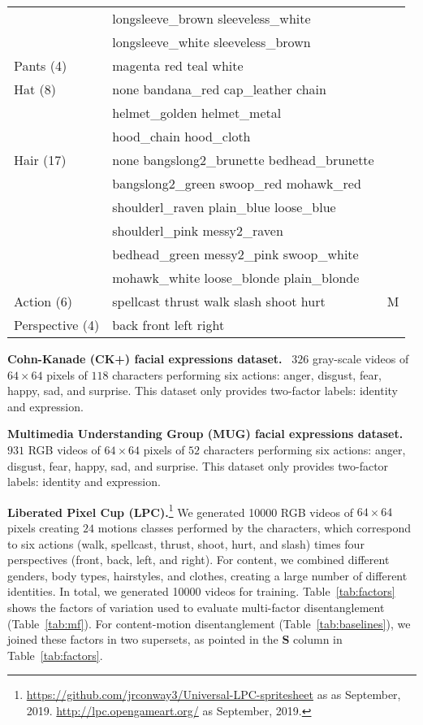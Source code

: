 \begin{table}[tb]
{\begin{tabular}{>{\ttfamily}l>{\ttfamily}l>{\ttfamily}r}
            & longsleeve\_brown sleeveless\_white \\
            & longsleeve\_white sleeveless\_brown \\ %
Pants (4) & magenta red teal white \\ %
Hat (8)   & none bandana\_red cap\_leather chain \\
          & helmet\_golden helmet\_metal \\
          & hood\_chain hood\_cloth \\ %
Hair (17) & none bangslong2\_brunette bedhead\_brunette \\
          & bangslong2\_green swoop\_red mohawk\_red \\
          & shoulderl\_raven plain\_blue loose\_blue \\
          & shoulderl\_pink messy2\_raven \\
          & bedhead\_green messy2\_pink swoop\_white \\
          & mohawk\_white loose\_blonde plain\_blonde \\ \midrule
Action (6) & spellcast thrust walk slash shoot hurt & M \\ %
Perspective (4) & back front left right \\
\bottomrule
\end{tabular}}
\end{table}

\textbf{Cohn-Kanade (CK+) facial expressions dataset.}~\cite{Kanade2000, Lucey2010} $326$ gray-scale videos of $64 \times 64$ pixels of $118$ characters performing six actions: anger, disgust, fear, happy, sad, and surprise.
This dataset only provides two-factor labels: identity and expression.

\textbf{Multimedia Understanding Group (MUG) facial expressions dataset.}~\cite{Aifanti2010} $931$ RGB videos of $64 \times 64$ pixels of $52$ characters performing six actions: anger, disgust, fear, happy, sad, and surprise.
This dataset only provides two-factor labels: identity and expression.

\textbf{Liberated Pixel Cup (LPC).}\footnote{\url{https://github.com/jrconway3/Universal-LPC-spritesheet} as as September, 2019. \newline\url{http://lpc.opengameart.org/} as September, 2019.} We generated \num{10000} RGB videos of $64\times 64$ pixels creating $24$ motions classes performed by the characters, which correspond to six actions (walk, spellcast, thrust, shoot, hurt, and slash) times four perspectives (front, back, left, and right).
For content, we combined different genders, body types, hairstyles, and clothes, creating a large number of different identities.
In total, we generated \num{10000} videos for training.
Table~\ref{tab:factors} shows the factors of variation used to evaluate multi-factor disentanglement (Table~\ref{tab:mf}).
For content-motion disentanglement (Table~\ref{tab:baselines}), we joined these factors in two supersets, as pointed in the \textbf{S} column in Table~\ref{tab:factors}.

